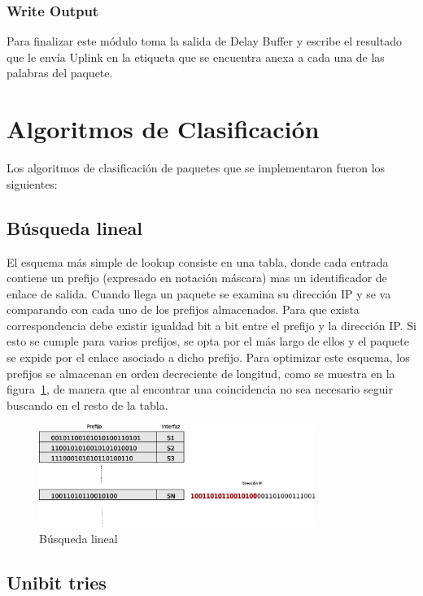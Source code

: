 \subsubsection{Write Output}
Para finalizar este módulo toma la salida de Delay Buffer y escribe el resultado que le envía Uplink en la etiqueta que se encuentra anexa a cada una de las palabras del paquete.

\section{Algoritmos de Clasificación}

Los algoritmos de clasificación de paquetes que se implementaron fueron los siguientes:

\subsection{Búsqueda lineal}

El esquema más simple de lookup consiste en una tabla, donde cada entrada contiene un prefijo (expresado en notación máscara) mas un identificador de enlace de salida. Cuando llega un paquete se examina su dirección IP y se va comparando con cada uno de los prefijos almacenados. Para que exista correspondencia debe existir igualdad bit a bit entre el prefijo y la dirección IP. Si esto se cumple para varios prefijos, se opta por el más largo de ellos y el paquete se expide por el enlace asociado a dicho prefijo.
Para optimizar este esquema, los prefijos se almacenan en orden decreciente de longitud, como se muestra en la figura~\ref{fig:linear}, de manera que al encontrar una coincidencia no sea necesario seguir buscando en el resto de la tabla. 

\begin{figure}[h]
  \centering
	\includegraphics[width=0.80\textwidth]{2-sistema/graf/linear.eps}
  \caption{Búsqueda lineal}
  \label{fig:linear}
\end{figure}

\newpage
\subsection {Unibit tries}

